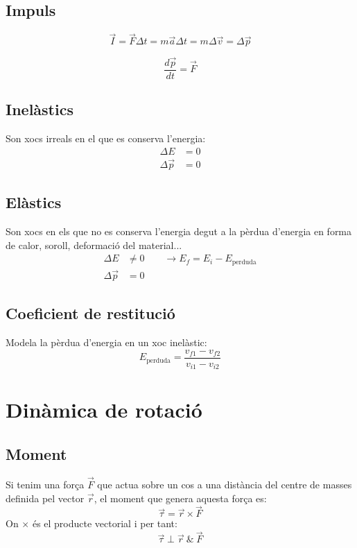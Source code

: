 \subsection{Impuls}
\begin{equation}
    \vec{I} = \vec{F}\Delta t = m \vec{a} \Delta t = m \Delta \vec{v} = \Delta \vec{p}
\end{equation}

\begin{equation}
    \frac{d\vec{p}}{dt} = \vec{F}
\end{equation}

\subsection{Inelàstics}
Son xocs irreals en el que es conserva l'energia:
\begin{align}
    \Delta E &= 0 \\
    \Delta \vec{p} &= 0
\end{align}



\subsection{Elàstics}
Son xocs en els que no es conserva l'energia degut a la pèrdua d'energia en forma de calor, soroll, deformació del material...
\begin{align}
    \Delta E &\neq 0 \qquad \rightarrow E_f = E_i - E_\text{perduda}\\
    \Delta \vec{p} &= 0
\end{align}

\subsection{Coeficient de restitució}
Modela la pèrdua d'energia en un xoc inelàstic:
\begin{equation}
    E_\text{perduda} = \frac{v_{f1}-v_{f2}}{v_{i1}-v_{i2}}
\end{equation}

\section{Dinàmica de rotació}
\subsection{Moment}
Si tenim una força $\vec{F}$ que actua sobre un cos a una distància del centre de masses definida pel vector $\vec{r}$, el moment que genera aquesta força es:
\begin{equation}
    \vec{\tau} = \vec{r} \times \vec{F}
\end{equation}
On $\times$ és el producte vectorial i per tant:
\begin{equation}
    \vec{\tau} \perp \vec{r}\ \&\ \vec{F}
\end{equation}

